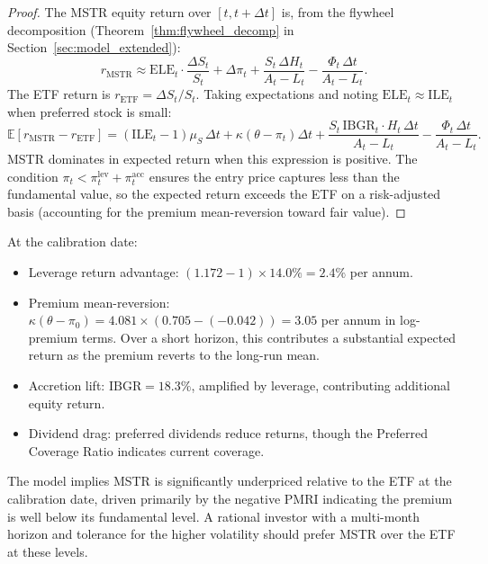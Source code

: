 \begin{proof}
The MSTR equity return over $[t, t + \Delta t]$ is, from the flywheel decomposition (Theorem~\ref{thm:flywheel_decomp} in Section~\ref{sec:model_extended}):
\[
  r_{\mathrm{MSTR}} \approx \mathrm{ELE}_t \cdot \frac{\Delta S_t}{S_t} + \Delta\pi_t + \frac{S_t\,\Delta H_t}{A_t - L_t} - \frac{\Phi_t\,\Delta t}{A_t - L_t}.
\]
The ETF return is $r_{\mathrm{ETF}} = \Delta S_t / S_t$. Taking expectations and noting $\mathrm{ELE}_t \approx \mathrm{ILE}_t$ when preferred stock is small:
\[
  \mathbb{E}[r_{\mathrm{MSTR}} - r_{\mathrm{ETF}}] = (\mathrm{ILE}_t - 1)\mu_S\,\Delta t + \kappa(\theta - \pi_t)\Delta t + \frac{S_t\, \mathrm{IBGR}_t \cdot H_t\, \Delta t}{A_t - L_t} - \frac{\Phi_t\,\Delta t}{A_t - L_t}.
\]
MSTR dominates in expected return when this expression is positive. The condition $\pi_t < \pi_t^{\mathrm{lev}} + \pi_t^{\mathrm{acc}}$ ensures the entry price captures less than the fundamental value, so the expected return exceeds the ETF on a risk-adjusted basis (accounting for the premium mean-reversion toward fair value).
\end{proof}

\begin{corollary}
\label{cor:current_mstr}
At the calibration date:
\begin{itemize}
  \item Leverage return advantage: $(1.172 - 1) \times 14.0\% = 2.4\%$ per annum.
  \item Premium mean-reversion: $\kappa(\theta - \pi_0) = 4.081 \times (0.705 - (-0.042)) = 3.05$ per annum in log-premium terms. Over a short horizon, this contributes a substantial expected return as the premium reverts to the long-run mean.
  \item Accretion lift: $\mathrm{IBGR} = 18.3\%$, amplified by leverage, contributing additional equity return.
  \item Dividend drag: preferred dividends reduce returns, though the Preferred Coverage Ratio indicates current coverage.
\end{itemize}
The model implies MSTR is significantly underpriced relative to the ETF at the calibration date, driven primarily by the negative PMRI indicating the premium is well below its fundamental level. A rational investor with a multi-month horizon and tolerance for the higher volatility should prefer MSTR over the ETF at these levels.
\end{corollary}

